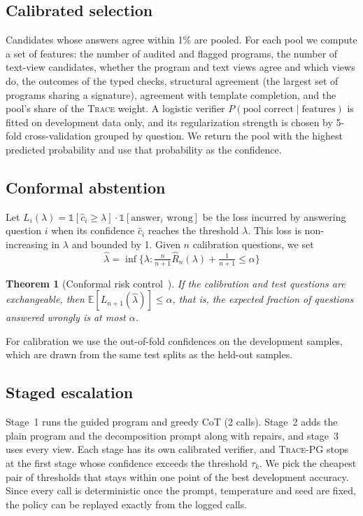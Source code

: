 \documentclass[conference]{IEEEtran}
\newcommand{\ours}{\textsc{Trace-PG}}
\newcommand{\trace}{\textsc{Trace}}
\newtheorem{theorem}{Theorem}
\begin{document}
\subsection{Calibrated selection}
Candidates whose answers agree within 1\% are pooled. For each pool we compute a set of features: the number of audited and flagged programs, the number of text-view candidates, whether the program and text views agree and which views do, the outcomes of the typed checks, structural agreement (the largest set of programs sharing a signature), agreement with template completion, and the pool's share of the \trace{} weight. A logistic verifier $P(\text{pool correct}\mid\text{features})$ is fitted on development data only, and its regularization strength is chosen by 5-fold cross-validation grouped by question. We return the pool with the highest predicted probability and use that probability as the confidence.

\subsection{Conformal abstention}
Let $L_i(\lambda)=\mathbb{1}[\hat c_i\ge\lambda]\cdot\mathbb{1}[\text{answer}_i\text{ wrong}]$ be the loss incurred by answering question $i$ when its confidence $\hat c_i$ reaches the threshold $\lambda$. This loss is non-increasing in $\lambda$ and bounded by 1. Given $n$ calibration questions, we set
\begin{equation}
\hat\lambda = \inf\Big\{\lambda : \tfrac{n}{n+1}\hat R_n(\lambda) + \tfrac{1}{n+1} \le \alpha\Big\}
\end{equation}
\begin{theorem}[Conformal risk control~\cite{crc}]
If the calibration and test questions are exchangeable, then $\mathbb{E}[L_{n+1}(\hat\lambda)]\le\alpha$, that is, the expected fraction of questions answered wrongly is at most $\alpha$.
\end{theorem}
For calibration we use the out-of-fold confidences on the development samples, which are drawn from the same test splits as the held-out samples.

\subsection{Staged escalation}
Stage~1 runs the guided program and greedy CoT (2 calls). Stage~2 adds the plain program and the decomposition prompt along with repairs, and stage~3 uses every view. Each stage has its own calibrated verifier, and \ours{} stops at the first stage whose confidence exceeds the threshold $\tau_k$. We pick the cheapest pair of thresholds that stays within one point of the best development accuracy. Since every call is deterministic once the prompt, temperature and seed are fixed, the policy can be replayed exactly from the logged calls.
\end{document}
